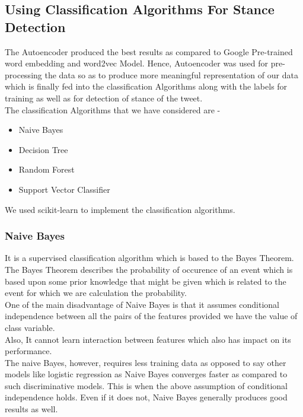 \documentclass[a4paper,11pt]{article}
\begin{document}
\newpage
\subsection{Using Classification Algorithms For Stance Detection}

The Autoencoder produced the best results as compared to Google Pre-trained word embedding and word2vec Model. Hence, Autoencoder was used for pre-processing the data so as to produce more meaningful representation of our data which is finally fed into the classification Algorithms along with the labels for training as well as for detection of stance of the tweet.
\medskip\\
The classification Algorithms that we have considered are - 
\begin{itemize}
    \item Naive Bayes
    \item Decision Tree
    \item Random Forest
    \item Support Vector Classifier
\end{itemize}

We used scikit-learn to implement the classification algorithms.
\subsubsection{Naive Bayes}
It is a supervised classification algorithm which is based to the Bayes Theorem. The Bayes Theorem describes the probability of occurence of an event which is based upon some prior knowledge that might be given which is related to the event for which we are calculation the probability.
\medskip\\
One of the main disadvantage of Naive Bayes is that it assumes conditional independence between all the pairs of the features provided we have the value of class variable.\\
Also, It cannot learn interaction between features which also has impact on its performance.
\medskip\\
The naive Bayes, however, requires less training data as opposed to say other models like logistic regression as Naive Bayes converges faster as compared to such discriminative models. This is when the above assumption of conditional independence holds. Even if it does not, Naive Bayes generally produces good results as well.
\cite{jadhav2016comparative}
\end{document}
